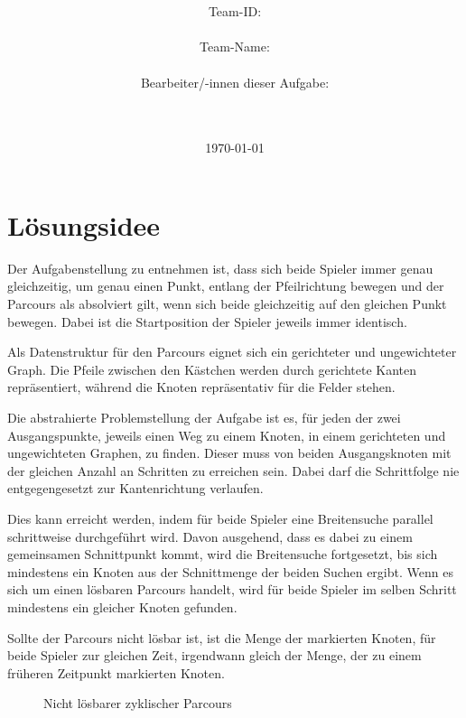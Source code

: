 \documentclass[a4paper,10pt,ngerman]{scrartcl}
\title{\textbf{\Huge\Aufgabe}}
\author{\LARGE Team-ID: \LARGE \TeamId \\\\
\LARGE Team-Name: \LARGE \TeamName \\\\
\LARGE Bearbeiter/-innen dieser Aufgabe: \\
\LARGE \Namen\\\\}
\date{\LARGE\today}
\begin{document}
    \maketitle
    \tableofcontents

    \vspace{0.5cm}


    \section{Lösungsidee}\label{sec:losungsidee}
    Der Aufgabenstellung zu entnehmen ist,
    dass sich beide Spieler immer genau gleichzeitig,
    um genau einen Punkt,
    entlang der Pfeilrichtung bewegen und der Parcours als absolviert gilt,
    wenn sich beide gleichzeitig auf den gleichen Punkt bewegen.
    Dabei ist die Startposition der Spieler jeweils immer identisch.

    Als Datenstruktur für den Parcours eignet sich ein gerichteter und ungewichteter Graph.
    Die Pfeile zwischen den Kästchen werden durch gerichtete Kanten repräsentiert,
    während die Knoten repräsentativ für die Felder stehen.

    Die abstrahierte Problemstellung der Aufgabe ist es,
    für jeden der zwei Ausgangspunkte,
    jeweils einen Weg zu einem Knoten,
    in einem gerichteten und ungewichteten Graphen,
    zu finden.
    Dieser muss von beiden Ausgangsknoten mit der gleichen Anzahl an Schritten zu erreichen sein.
    Dabei darf die Schrittfolge nie entgegengesetzt zur Kantenrichtung verlaufen.

    Dies kann erreicht werden,
    indem für beide Spieler eine Breitensuche parallel schrittweise durchgeführt wird.
    Davon ausgehend, dass es dabei zu einem gemeinsamen Schnittpunkt kommt,
    wird die Breitensuche fortgesetzt,
    bis sich mindestens ein Knoten aus der Schnittmenge der beiden Suchen ergibt.
    Wenn es sich um einen lösbaren Parcours handelt,
    wird für beide Spieler im selben Schritt mindestens ein gleicher Knoten gefunden.

    Sollte der Parcours nicht lösbar ist,
    ist die Menge der markierten Knoten,
    für beide Spieler zur gleichen Zeit,
    irgendwann gleich der Menge,
    der zu einem früheren Zeitpunkt markierten Knoten.

    \begin{figure}
        \centering
        \FigurEins{}
        \caption{Nicht lösbarer zyklischer Parcours}
        \label{fig:Figure1}
    \end{figure}
\end{document}
